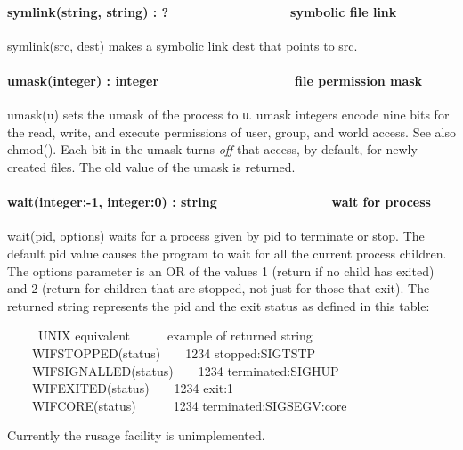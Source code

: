 \paragraph[symlink(string, string) : ?\ \ \ \ \ \ \ \ \ \ \ \ 
\ \ \ \ \ symbolic file link]{symlink(string, string) :
?\ \ \ \ \ \ \ \ \ \ \ \  \ \ \ \ \ symbolic file link}
symlink(src, dest) makes a symbolic link dest
that points to src.

\paragraph[umask(integer) : integer\ \ \ \ \ \ \ \ \ \ 
\ \ \ \ \ \ \ \ \ file permission mask]{umask(integer) :
integer\ \ \ \ \ \ \ \ \ \  \ \ \ \ \ \ \ \ \ file permission mask}
umask(u) sets the umask of the process to \texttt{u}. umask integers
encode nine bits for the read, write, and execute permissions of user,
group, and world access. See also chmod(). Each bit in the umask turns
\textit{off} that access, by default, for newly created files. The old
value of the umask is returned.

\paragraph[wait(integer:{}-1, integer:0) : string\ \ \ \ \ \ \ \ \ \ 
\ \ \ \ \ \ wait for process]{wait(integer:-1, integer:0) :
string\ \ \ \ \ \ \ \ \ \  \ \ \ \ \ \ wait for process}
wait(pid, options) waits for a process given by pid to terminate or
stop. The default pid value causes the program to wait for all the
current process{\textquotesingle} children. The options parameter is an
OR of the values 1 (return if no child has exited) and 2 (return for
children that are stopped, not just for those that exit). The returned
string represents the pid and the exit status as defined in this table:


\ \ \ \ \ UNIX equivalent\ \ \ \ \ \ example of returned string\\
 \ \ \ \ WIFSTOPPED(status)\ \ \ \ {\textquotedbl}1234
stopped:SIGTSTP{\textquotedbl} \\
 \ \ \ \ WIFSIGNALLED(status)\ \ \ \ {\textquotedbl}1234
terminated:SIGHUP{\textquotedbl} \\
 \ \ \ \ WIFEXITED(status)\ \ \ \ {\textquotedbl}1234
exit:1{\textquotedbl} \\
 \ \ \ \ WIFCORE(status)\ \ \ \ \ \ {\textquotedbl}1234
terminated:SIGSEGV:core{\textquotedbl} 

Currently the \textsf{rusage} facility is unimplemented.

